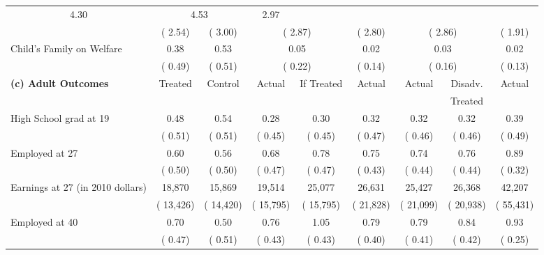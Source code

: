 \begin{table}[htbp]
\begin{center}
\begin{tabular}{lcccccccc}
\multicolumn{1}{c}{         4.30} &
\multicolumn{2}{c}{         4.53} &
\multicolumn{1}{c}{         2.97} 
 \\[0.05cm]  
 & (        2.54) & (        3.00) & \multicolumn{2}{c}{(        2.87)} &
\multicolumn{1}{c}{(        2.80)} &
\multicolumn{2}{c}{(        2.86)} &
\multicolumn{1}{c}{(        1.91)} 
 \\[0.2cm]  
Child's Family on Welfare &         0.38 &         0.53 & \multicolumn{2}{c}{         0.05} &
\multicolumn{1}{c}{         0.02} &
\multicolumn{2}{c}{         0.03} &
\multicolumn{1}{c}{         0.02} 
 \\[0.05cm]  
 & (        0.49) & (        0.51) & \multicolumn{2}{c}{(        0.22)} &
\multicolumn{1}{c}{(        0.14)} &
\multicolumn{2}{c}{(        0.16)} &
\multicolumn{1}{c}{(        0.13)} 
 \\[0.2cm]  
\hline
\textbf{(c) Adult Outcomes} &Treated &Control  &Actual &If Treated &Actual &Actual &Disadv. &Actual \\[0.02cm] 
 & &  && & & & Treated & \\[0.2cm] 
High School grad at 19 &         0.48 &         0.54 &         0.28 &         0.30 &         0.32 &         0.32 &         0.32 &         0.39 \\[0.05cm]  
 & (        0.51) & (        0.51) & (        0.45) & (        0.45) & (        0.47) & (        0.46) & (        0.46) & (        0.49)   \\[0.2cm]  
Employed at 27 &         0.60 &         0.56 &         0.68 &         0.78 &         0.75 &         0.74 &         0.76 &         0.89 \\[0.05cm]  
 & (        0.50) & (        0.50) & (        0.47) & (        0.47) & (        0.43) & (        0.44) & (        0.44) & (        0.32)   \\[0.2cm]  
Earnings at 27 (in 2010 dollars) &       18,870 &       15,869 &       19,514 &       25,077 &       26,631 &       25,427 &       26,368 &       42,207 \\[0.05cm]  
 & (      13,426) & (      14,420) & (      15,795) & (      15,795) & (      21,828) & (      21,099) & (      20,938) & (      55,431)   \\[0.2cm]  
Employed at 40 &         0.70 &         0.50 &         0.76 &         1.05 &         0.79 &         0.79 &         0.84 &         0.93 \\[0.05cm]  
 & (        0.47) & (        0.51) & (        0.43) & (        0.43) & (        0.40) & (        0.41) & (        0.42) & (        0.25)   \\[0.2cm]  

\end{tabular}
\end{center}
\end{table}
